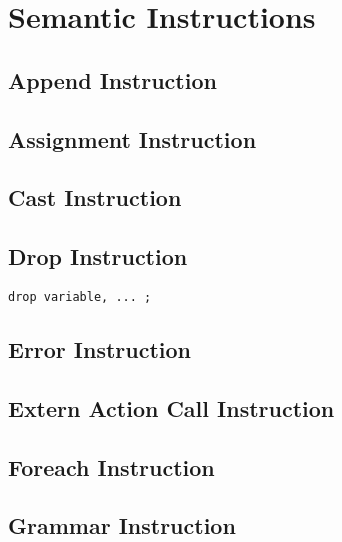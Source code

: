 
\chapter{Semantic Instructions}



\section{Append Instruction}


\section{Assignment Instruction}


\section{Cast Instruction}



\section{Drop Instruction}

{
\begin{lstlisting}[language=galgas]
drop variable, ... ;
\end{lstlisting}
}

\section{Error Instruction}


\section{Extern Action Call Instruction}




\section{Foreach Instruction}




\section{Grammar Instruction}

